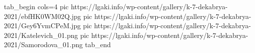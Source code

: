 
 
 
 
 

\ifcmt
  tab_begin cols=4
     pic https://lgaki.info/wp-content/gallery/k-7-dekabrya-2021/ebfHK0WM02Q.jpg
     pic https://lgaki.info/wp-content/gallery/k-7-dekabrya-2021/Gey6YvmCPeM.jpg
		 pic https://lgaki.info/wp-content/gallery/k-7-dekabrya-2021/Katelevich_01.png
		 pic https://lgaki.info/wp-content/gallery/k-7-dekabrya-2021/Samorodova_01.png
  tab_end
\fi
